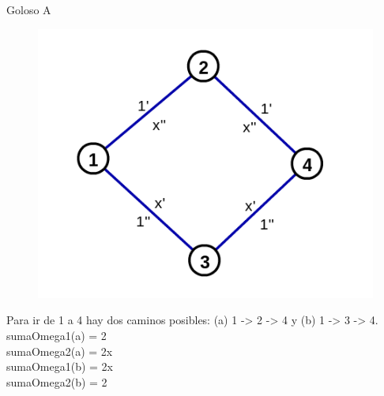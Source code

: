 \documentclass[11pt, a4paper, twoside]{article}
\begin{document}


Goloso A

\begin{figure}[H]
\begin{center}
\includegraphics{imagenes/maloGreedyA.png}
\end{center}
\end{figure}

Para ir de 1 a 4 hay dos caminos posibles: (a) 1 -> 2 -> 4 y (b) 1 -> 3 -> 4.
\\sumaOmega1(a) = 2
\\sumaOmega2(a) = 2x
\\sumaOmega1(b) = 2x
\\sumaOmega2(b) = 2

\end{document}
